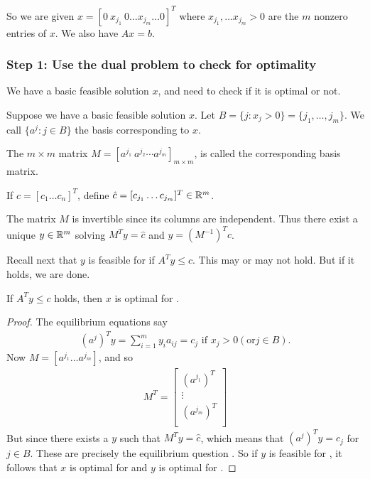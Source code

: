 So we are given $x = [0 \ x_{j_1} \ 0 \dots x_{j_m} \dots 0]^T$ where $x_{j_1}, \dots x_{j_m} > 0$ are the $m$ nonzero entries of $x$.
We also have $Ax = b$.

\subsubsection{Step 1: Use the dual problem to check for optimality}

We have a basic feasible solution $x$, and need to check if it is optimal or not.

\begin{definition}
Suppose we have a basic feasible solution $x$.
Let $B = \{ j : x_j > 0 \} = \{ j_1, \dots, j_m \}$. 
We call $\{ a^j: j \in B \}$ the basis corresponding to $x$.

The $m \times m$ matrix $M = [a^{j_1} \ a^{j_2} \cdots a^{j_m}]_{m \times m}$, is called the corresponding basis matrix.

If $c = [c_1 \dots c_n]^T$, define $\hat{c} = [c_{j_1} \dots c_{j_m}]^T \in \mathbb{R}^m$.
\end{definition}

\begin{remark}
The matrix $M$ is invertible since its columns are independent.
Thus there exist a unique $y \in \mathbb{R}^m$ solving $M^T y = \hat{c}$ and $y = (M^{-1})^T \hat{c}$.

Recall next that $y$ is feasible for  if $A^T y \le c$.
This may or may not hold.
But if it holds, we are done.
\end{remark}

\begin{lemma}
If $A^T y \le c$ holds, then $x$ is optimal for .
\end{lemma}

\begin{proof}
The equilibrium equations  say 
\begin{align}
(a^j)^T y = \sum _{i=1}^{m} y_i a_{ij} = c_j \text{ if } x_j > 0 (\text{or} j \in B).
\end{align}
Now $M = [a^{j_1} \dots a^{j_m}]$, and so
\begin{align}
M^T = \begin{bmatrix}
(a^{j_1})^T \\
\vdots \\
(a^{j_m})^T \\
\end{bmatrix}
\end{align}
But since there exists a $y$ such that $M^T y = \hat{c}$, which means that $(a^j)^T y = c_j$ for $j \in B$.
These are precisely the equilibrium question . 
So if $y$ is feasible for , it follows that $x$ is optimal for  and $y$ is optimal for .
\end{proof}

